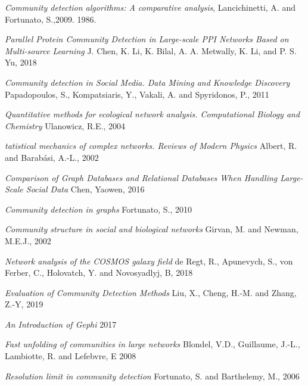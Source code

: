 \documentclass[12pt]{article}
\begin{document}
\pagebreak
\begin{thebibliography}{100}

  
    \textit{Community detection algorithms: A comparative analysis},
    Lancichinetti, A. and Fortunato, S.,2009.
    1986.
  
    \textit{Parallel Protein Community Detection in
    Large-scale PPI Networks Based on
    Multi-source Learning}
    J. Chen, K. Li, K. Bilal, A. A. Metwally, K. Li, and P. S. Yu,
    2018
    
    \textit{Community detection in Social Media. Data Mining and Knowledge Discovery}
    Papadopoulos, S., Kompatsiaris, Y., Vakali, A. and Spyridonos, P.,
    2011
    
    \textit{Quantitative methods for ecological network analysis. Computational Biology and Chemistry}
    Ulanowicz, R.E.,
    2004
    
    \textit{tatistical mechanics of complex networks. Reviews of Modern Physics}
    Albert, R. and Barabási, A.-L.,
    2002
    
    \textit{Comparison of Graph Databases and Relational Databases When Handling Large-Scale Social Data}
    Chen, Yaowen,
    2016
    
    \textit{Community detection in graphs}
    Fortunato, S.,
    2010
    
    \textit{Community structure in social and biological networks}
    Girvan, M. and Newman, M.E.J.,
    2002
    
    \textit{Network analysis of the COSMOS galaxy field}
    de Regt, R., Apunevych, S., von Ferber, C., Holovatch, Y. and Novosyadlyj, B,
    2018
    
    \textit{Evaluation of Community Detection Methods}
    Liu, X., Cheng, H.-M. and Zhang, Z.-Y,
    2019
    
    \textit{An Introduction of Gephi}
    2017

    \textit{Fast unfolding of communities in large networks}
    Blondel, V.D., Guillaume, J.-L., Lambiotte, R. and Lefebvre, E
    2008
    
    \textit{Resolution limit in community detection}
    Fortunato, S. and Barthelemy, M.,
    2006



        
\end{thebibliography}
\end{document}
